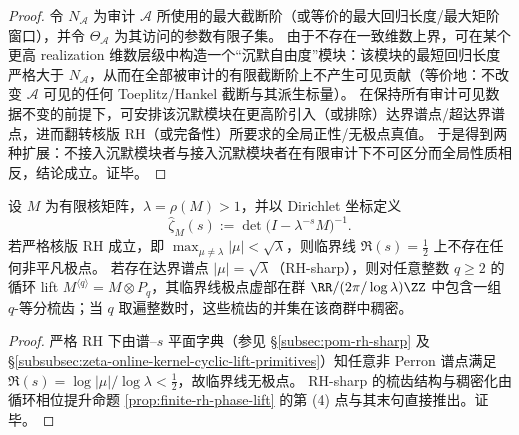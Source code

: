 \begin{proof}
令 \(N_{\mathcal A}\) 为审计 \(\mathcal A\) 所使用的最大截断阶（或等价的最大回归长度/最大矩阶窗口），并令 \(\Theta_{\mathcal A}\) 为其访问的参数有限子集。
由于不存在一致维数上界，可在某个更高 realization 维数层级中构造一个“沉默自由度”模块：该模块的最短回归长度严格大于 \(N_{\mathcal A}\)，从而在全部被审计的有限截断阶上不产生可见贡献（等价地：不改变 \(\mathcal A\) 可见的任何 Toeplitz/Hankel 截断与其派生标量）。
在保持所有审计可见数据不变的前提下，可安排该沉默模块在更高阶引入（或排除）达界谱点/超达界谱点，进而翻转核版 RH（或完备性）所要求的全局正性/无极点真值。
于是得到两种扩展：不接入沉默模块者与接入沉默模块者在有限审计下不可区分而全局性质相反，结论成立。证毕。
\end{proof}

\begin{corollary}\label{cor:xi-critical-line-poles-empty-or-dense}
设 \(M\) 为有限核矩阵，\(\lambda=\rho(M)>1\)，并以 Dirichlet 坐标定义
\[
\widehat{\zeta}_M(s):=\det\!\bigl(I-\lambda^{-s}M\bigr)^{-1}.
\]
若严格核版 RH 成立，即 \(\max_{\mu\neq\lambda}|\mu|<\sqrt{\lambda}\)，则临界线 \(\Re(s)=\tfrac12\) 上不存在任何非平凡极点。
若存在达界谱点 \(|\mu|=\sqrt{\lambda}\)（RH-sharp），则对任意整数 \(q\ge 2\) 的循环 lift \(M^{\langle q\rangle}=M\otimes P_q\)，其临界线极点虚部在群 \(\RR/(2\pi/\log\lambda)\ZZ\) 中包含一组 \(q\)-等分梳齿；当 \(q\) 取遍整数时，这些梳齿的并集在该商群中稠密。
\end{corollary}

\begin{proof}
严格 RH 下由谱--\(s\) 平面字典（参见 \S\ref{subsec:pom-rh-sharp} 及 \S\ref{subsubsec:zeta-online-kernel-cyclic-lift-primitives}）知任意非 Perron 谱点满足 \(\Re(s)=\log|\mu|/\log\lambda<\tfrac12\)，故临界线无极点。
RH-sharp 的梳齿结构与稠密化由循环相位提升命题 \ref{prop:finite-rh-phase-lift} 的第 (4) 点与其末句直接推出。证毕。
\end{proof}

